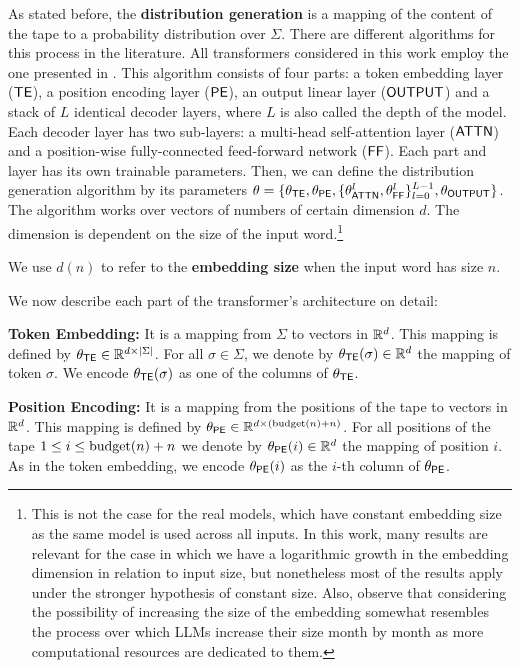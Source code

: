 \smallskip


As stated before, the \textbf{distribution generation} is a mapping of the content of the tape to a probability distribution over $\Sigma$.
There are different algorithms for this process in the literature.
All transformers considered in this work employ the one presented in \citet{toyota}.
This algorithm consists of four parts: a token embedding layer ($\mathsf{TE}$), a position encoding layer ($\mathsf{PE}$), an output linear layer ($\mathsf{OUTPUT}$) and a stack of $L$ identical decoder layers, where $L$ is also called the depth of the model. 
Each decoder layer has two sub-layers: a multi-head self-attention layer ($\mathsf{ATTN}$) and a position-wise fully-connected feed-forward network ($\mathsf{FF}$). 
Each part and layer has its own trainable parameters.
Then, we can define the distribution generation algorithm by its parameters $\theta = \{\theta_{\mathsf{TE}}, \theta_{\mathsf{PE}}, \{\theta_{\mathsf{ATTN}}^{l}, \theta_{\mathsf{FF}}^{l}\}_{l=0}^{L-1}, \theta_{\mathsf{OUTPUT}}\}$.
The algorithm works over vectors of numbers of certain dimension $d$.
The dimension is dependent on the size of the input word.\footnote{This is not the case for the real models, which have constant embedding size as the same model is used across all inputs. 
In this work, many results are relevant for the case in which we have a logarithmic growth in the embedding dimension in relation to input size, but nonetheless most of the results apply under the stronger hypothesis of constant size. 
Also, observe that considering the possibility of increasing the size of the embedding somewhat resembles the process over which LLMs increase their size month by month as more computational resources are dedicated to them.}


We use $d(n)$ to refer to the \textbf{embedding size} when the input word has size $n$.

We now describe each part of the transformer's architecture on detail:

\textbf{Token Embedding:} It is a mapping from $\Sigma$ to vectors in $\mathbb{R}^d$. 
This mapping is defined by $\theta_{\mathsf{TE}} \in \mathbb{R}^{d \times | \Sigma |}$. 
For all $\sigma \in \Sigma$, we denote by $\theta_{\mathsf{TE}}(\sigma) \in \mathbb{R}^d$ the mapping of token $\sigma$. 
We encode $\theta_{\mathsf{TE}}(\sigma)$ as one of the columns of $\theta_{\mathsf{TE}}$.

\textbf{Position Encoding:} It is a mapping from the positions of the tape to vectors in $\mathbb{R}^d$.
This mapping is defined by $\theta_{\mathsf{PE}} \in \mathbb{R}^{d \times (\mathrm{budget}(n) + n)}$. 
For all positions of the tape $1 \leq i \leq \mathrm{budget}(n) + n$ we denote by $\theta_{\mathsf{PE}}(i) \in \mathbb{R}^d$ the mapping of position $i$.
As in the token embedding, we encode $\theta_{\mathsf{PE}}(i)$ as the $i$-th column of $\theta_{\mathsf{PE}}$.

